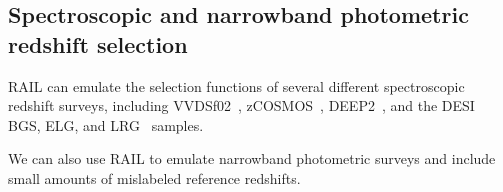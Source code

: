 \subsection{Spectroscopic and narrowband photometric redshift
  selection}

RAIL can emulate the selection functions of several different
spectroscopic redshift surveys, including VVDSf02~\cite{2008yCat.2286....0M}, zCOSMOS~\cite{2007ApJS..172...70L},
DEEP2~\cite{2013ApJS..208....5N}, and the DESI BGS, ELG, and LRG~
\cite{desicollaboration2025datarelease1dark} samples.

We can also use RAIL to emulate narrowband photometric surveys and
include small amounts of mislabeled reference redshifts.
